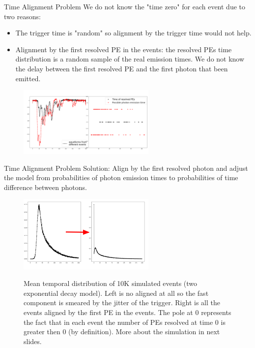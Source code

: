 \documentclass{beamer}
\begin{document}
\begin{frame}{Time Alignment Problem}
We do not know the "time zero" for each event due to two reasons:\\
\begin{itemize}
\item The trigger time is "random" so alignment by the trigger time would not help.
\item Alignment by the first resolved PE in the events: the resolved PEs time distribution is a random sample of the real emission times. We do not know the delay between the first resolved PE and the first photon that been emitted.
\end{itemize}
\begin{figure}[h]
\includegraphics[width=0.6\textwidth]{alignment.png}
\end{figure}
\end{frame}

\begin{frame}{Time Alignment Problem}
Solution: Align by the first resolved photon and adjust the model from probabilities of photon emission times to probabilities of time difference between photons.  
\begin{figure}[h]
\includegraphics[width=0.6\textwidth]{sim1.png}
\label{sim_temp}
\caption{Mean temporal distribution of 10K simulated events (two exponential decay model). Left is no aligned at all so the fast component is smeared by the jitter of the trigger. Right is all the events aligned by the first PE in the events. The pole at 0 represents the fact that in each event the number of PEs resolved at time 0 is greater then 0 (by definition). More about the simulation in next slides.}
\label{sim_temp} 
\end{figure}
\end{frame}
\end{document}
